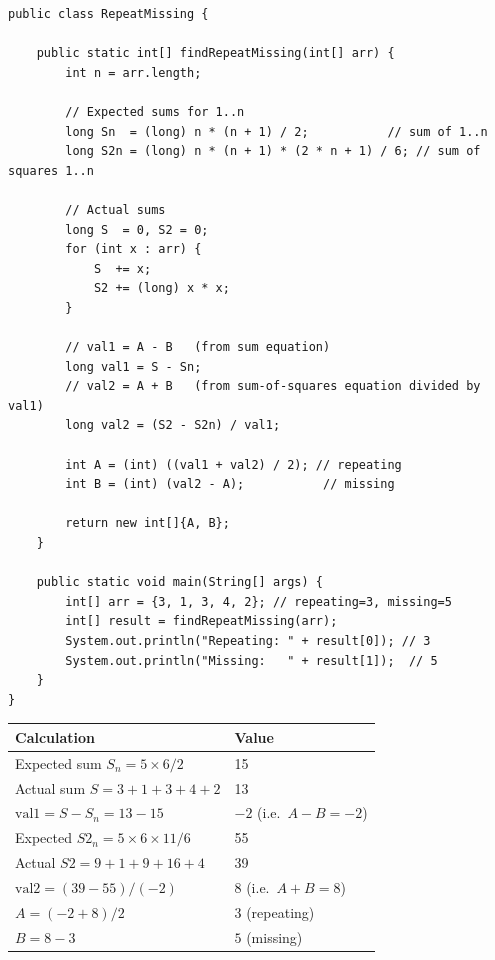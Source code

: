 \documentclass[12pt,a4paper,oneside]{book}
\begin{document}
\begin{lstlisting}[caption={Repeating and Missing --- Math approach, O(n) time O(1) space}]
public class RepeatMissing {

    public static int[] findRepeatMissing(int[] arr) {
        int n = arr.length;

        // Expected sums for 1..n
        long Sn  = (long) n * (n + 1) / 2;           // sum of 1..n
        long S2n = (long) n * (n + 1) * (2 * n + 1) / 6; // sum of squares 1..n

        // Actual sums
        long S  = 0, S2 = 0;
        for (int x : arr) {
            S  += x;
            S2 += (long) x * x;
        }

        // val1 = A - B   (from sum equation)
        long val1 = S - Sn;
        // val2 = A + B   (from sum-of-squares equation divided by val1)
        long val2 = (S2 - S2n) / val1;

        int A = (int) ((val1 + val2) / 2); // repeating
        int B = (int) (val2 - A);           // missing

        return new int[]{A, B};
    }

    public static void main(String[] args) {
        int[] arr = {3, 1, 3, 4, 2}; // repeating=3, missing=5
        int[] result = findRepeatMissing(arr);
        System.out.println("Repeating: " + result[0]); // 3
        System.out.println("Missing:   " + result[1]);  // 5
    }
}
\end{lstlisting}

\begin{dryrun}[arr = \{3, 1, 3, 4, 2\}, n = 5]
\begin{center}
\begin{tabular}{ll}
\toprule
\textbf{Calculation} & \textbf{Value}\\
\midrule
Expected sum $S_n = 5 \times 6/2$        & 15\\
Actual sum $S = 3+1+3+4+2$               & 13\\
$\text{val1} = S - S_n = 13 - 15$        & $-2$ \quad (i.e.\ $A - B = -2$)\\
Expected $S2_n = 5 \times 6 \times 11/6$ & 55\\
Actual $S2 = 9+1+9+16+4$                 & 39\\
$\text{val2} = (39-55)/(-2)$             & $8$ \quad (i.e.\ $A + B = 8$)\\
$A = (-2 + 8)/2$                         & $3$ (repeating)\\
$B = 8 - 3$                              & $5$ (missing)\\
\bottomrule
\end{tabular}
\end{center}
\end{dryrun}
\end{document}
